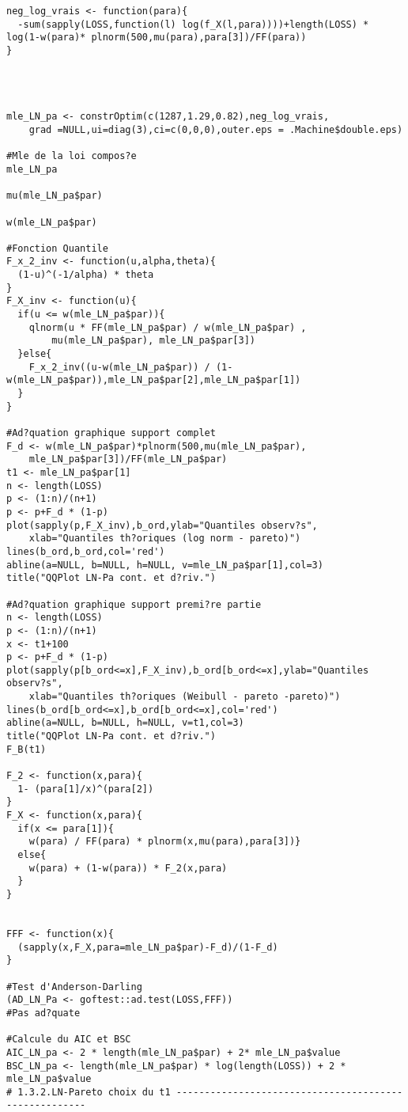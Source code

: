\begin{verbatim}
neg_log_vrais <- function(para){
  -sum(sapply(LOSS,function(l) log(f_X(l,para))))+length(LOSS) * log(1-w(para)* plnorm(500,mu(para),para[3])/FF(para))
}




mle_LN_pa <- constrOptim(c(1287,1.29,0.82),neg_log_vrais,
	grad =NULL,ui=diag(3),ci=c(0,0,0),outer.eps = .Machine$double.eps)

#Mle de la loi compos?e
mle_LN_pa

mu(mle_LN_pa$par)

w(mle_LN_pa$par)

#Fonction Quantile
F_x_2_inv <- function(u,alpha,theta){
  (1-u)^(-1/alpha) * theta
}
F_X_inv <- function(u){
  if(u <= w(mle_LN_pa$par)){
    qlnorm(u * FF(mle_LN_pa$par) / w(mle_LN_pa$par) , 
    	mu(mle_LN_pa$par), mle_LN_pa$par[3])
  }else{
    F_x_2_inv((u-w(mle_LN_pa$par)) / (1-w(mle_LN_pa$par)),mle_LN_pa$par[2],mle_LN_pa$par[1])
  }
}

#Ad?quation graphique support complet
F_d <- w(mle_LN_pa$par)*plnorm(500,mu(mle_LN_pa$par),
	mle_LN_pa$par[3])/FF(mle_LN_pa$par)
t1 <- mle_LN_pa$par[1]
n <- length(LOSS)
p <- (1:n)/(n+1)
p <- p+F_d * (1-p)
plot(sapply(p,F_X_inv),b_ord,ylab="Quantiles observ?s",
	xlab="Quantiles th?oriques (log norm - pareto)")
lines(b_ord,b_ord,col='red')
abline(a=NULL, b=NULL, h=NULL, v=mle_LN_pa$par[1],col=3)
title("QQPlot LN-Pa cont. et d?riv.")

#Ad?quation graphique support premi?re partie
n <- length(LOSS)
p <- (1:n)/(n+1)
x <- t1+100
p <- p+F_d * (1-p)
plot(sapply(p[b_ord<=x],F_X_inv),b_ord[b_ord<=x],ylab="Quantiles observ?s",
	xlab="Quantiles th?oriques (Weibull - pareto -pareto)")
lines(b_ord[b_ord<=x],b_ord[b_ord<=x],col='red')
abline(a=NULL, b=NULL, h=NULL, v=t1,col=3)
title("QQPlot LN-Pa cont. et d?riv.")
F_B(t1)

F_2 <- function(x,para){
  1- (para[1]/x)^(para[2])
}
F_X <- function(x,para){
  if(x <= para[1]){
    w(para) / FF(para) * plnorm(x,mu(para),para[3])}
  else{
    w(para) + (1-w(para)) * F_2(x,para)
  }
}


FFF <- function(x){
  (sapply(x,F_X,para=mle_LN_pa$par)-F_d)/(1-F_d)
}

#Test d'Anderson-Darling
(AD_LN_Pa <- goftest::ad.test(LOSS,FFF))
#Pas ad?quate

#Calcule du AIC et BSC
AIC_LN_pa <- 2 * length(mle_LN_pa$par) + 2* mle_LN_pa$value 
BSC_LN_pa <- length(mle_LN_pa$par) * log(length(LOSS)) + 2 * mle_LN_pa$value
# 1.3.2.LN-Pareto choix du t1 ------------------------------------------------------


\end{verbatim}
